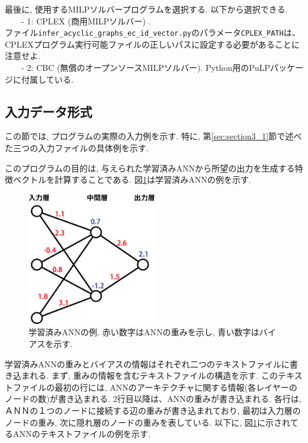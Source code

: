 \documentclass[11pt, titlepage, dvipdfmx, twoside]{jarticle}
\begin{document}
最後に, 使用するMILPソルバープログラムを選択する. 以下から選択できる.  \\
~~~~- 1: CPLEX (商用MILPソルバー) \cite{cplex}. \\
ファイル{\tt infer\_acyclic\_graphs\_ec\_id\_vector.py}のパラメータ{\tt CPLEX\_PATH}は、CPLEXプログラム実行可能ファイルの正しいパスに設定する必要があることに注意せよ. \\
~~~~- 2: CBC (無償のオープンソースMILPソルバー). Python用のPuLPパッケージ\cite{PuLP1}に付属している. 




\subsection{入力データ形式}
\label{sec:section3_2}

この節では, プログラムの実際の入力例を示す. 
特に, 第\ref{sec:section3_1}節で述べた三つの入力ファイルの具体例を示す. 

このプログラムの目的は, 与えられた学習済みANNから所望の出力を生成する特徴ベクトルを計算することである. 
図\ref{fig:sample}は学習済みANNの例を示す. 


\begin{figure}[H]
  \centering
  \includegraphics[width=0.5\textwidth]{./fig/ANN_sample_jp}
  \caption{学習済みANNの例. 赤い数字はANNの重みを示し, 青い数字はバイアスを示す. }
  \label{fig:sample}
\end{figure}


学習済みANNの重みとバイアスの情報はそれぞれ二つのテキストファイルに書き込まれる. 
まず, 重みの情報を含むテキストファイルの構造を示す. 
このテキストファイルの最初の行には, ANNのアーキテクチャに関する情報(各レイヤーのノードの数)が書き込まれる. 
2行目以降は、ANNの重みが書き込まれる. 
各行は, ＡＮＮの１つのノードに接続する辺の重みが書き込まれており, 最初は入力層のノードの重み, 次に隠れ層のノードの重みを表している. 
以下に, 図\ref{fig:sample}に示されてるANNのテキストファイルの例を示す. 
\end{document}

